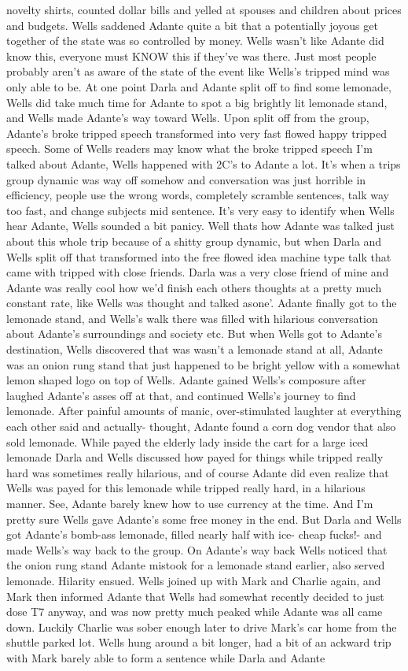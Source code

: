 \documentclass[12pt]{book}
\begin{document}
novelty shirts, counted dollar bills and yelled at spouses and children about prices and budgets. Wells saddened Adante quite a bit that a potentially joyous get together of the state was so controlled by money. Wells wasn't like Adante did know this, everyone must KNOW this if they've was there. Just most people probably aren't as aware of the state of the event like Wells's tripped mind was only able to be. At one point Darla and Adante split off to find some lemonade, Wells did take much time for Adante to spot a big brightly lit lemonade stand, and Wells made Adante's way toward Wells. Upon split off from the group, Adante's broke tripped speech transformed into very fast flowed happy tripped speech. Some of Wells readers may know what the broke tripped speech I'm talked about Adante, Wells happened with 2C's to Adante a lot. It's when a trips group dynamic was way off somehow and conversation was just horrible in efficiency, people use the wrong words, completely scramble sentences, talk way too fast, and change subjects mid sentence. It's very easy to identify when Wells hear Adante, Wells sounded a bit panicy. Well thats how Adante was talked just about this whole trip because of a shitty group dynamic, but when Darla and Wells split off that transformed into the free flowed idea machine type talk that came with tripped with close friends. Darla was a very close friend of mine and Adante was really cool how we'd finish each others thoughts at a pretty much constant rate, like Wells was thought and talked asone'. Adante finally got to the lemonade stand, and Wells's walk there was filled with hilarious conversation about Adante's surroundings and society etc. But when Wells got to Adante's destination, Wells discovered that was wasn't a lemonade stand at all, Adante was an onion rung stand that just happened to be bright yellow with a somewhat lemon shaped logo on top of Wells. Adante gained Wells's composure after laughed Adante's asses off at that, and continued Wells's journey to find lemonade. After painful amounts of manic, over-stimulated laughter at everything each other said and actually- thought, Adante found a corn dog vendor that also sold lemonade. While payed the elderly lady inside the cart for a large iced lemonade Darla and Wells discussed how payed for things while tripped really hard was sometimes really hilarious, and of course Adante did even realize that Wells was payed for this lemonade while tripped really hard, in a hilarious manner. See, Adante barely knew how to use currency at the time. And I'm pretty sure Wells gave Adante's some free money in the end. But Darla and Wells got Adante's bomb-ass lemonade, filled nearly half with ice- cheap fucks!- and made Wells's way back to the group. On Adante's way back Wells noticed that the onion rung stand Adante mistook for a lemonade stand earlier, also served lemonade. Hilarity ensued. Wells joined up with Mark and Charlie again, and Mark then informed Adante that Wells had somewhat recently decided to just dose T7 anyway, and was now pretty much peaked while Adante was all came down. Luckily Charlie was sober enough later to drive Mark's car home from the shuttle parked lot. Wells hung around a bit longer, had a bit of an ackward trip with Mark barely able to form a sentence while Darla and Adante 
\end{document}
